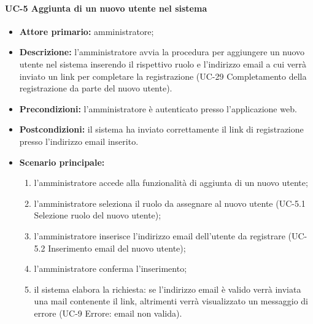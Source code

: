 \paragraph{UC-5 Aggiunta di un nuovo utente nel sistema}
\begin{itemize}
    \item \textbf{Attore primario:} amministratore; 

    \item \textbf{Descrizione:} l'amministratore avvia la procedura per aggiungere un nuovo utente nel sistema inserendo il rispettivo ruolo e l'indirizzo email a cui verrà inviato un link per completare la registrazione (UC-29 Completamento della registrazione da parte del nuovo utente).

    \item \textbf{Precondizioni:} l'amministratore è  autenticato presso l'applicazione web.

    \item \textbf{Postcondizioni:} il sistema ha inviato correttamente il link di registrazione presso l'indirizzo email inserito.

    \item \textbf{Scenario principale:}
          \begin{enumerate}
              \item l'amministratore accede alla funzionalità di aggiunta di un nuovo utente;
              \item l'amministratore seleziona il ruolo da assegnare al nuovo utente (UC-5.1 Selezione ruolo del nuovo utente);
              \item l'amministratore inserisce l'indirizzo email dell'utente da registrare (UC-5.2 Inserimento email del nuovo utente);
              \item l'amministratore conferma l'inserimento;
              \item il sistema elabora la richiesta: se l'indirizzo email è valido verrà inviata una mail contenente il link, altrimenti verrà visualizzato un messaggio di errore (UC-9 Errore: email non valida).
          \end{enumerate}
\end{itemize}

